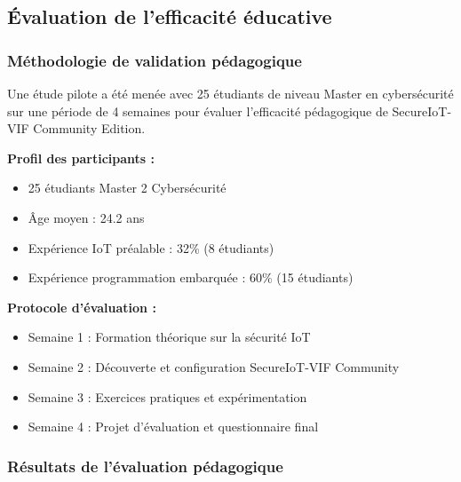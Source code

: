 \subsection{Évaluation de l'efficacité éducative}

\subsubsection{Méthodologie de validation pédagogique}

Une étude pilote a été menée avec 25 étudiants de niveau Master en cybersécurité sur une période de 4 semaines pour évaluer l'efficacité pédagogique de SecureIoT-VIF Community Edition.

\textbf{Profil des participants :}
\begin{itemize}
    \item 25 étudiants Master 2 Cybersécurité
    \item Âge moyen : 24.2 ans
    \item Expérience IoT préalable : 32\% (8 étudiants)
    \item Expérience programmation embarquée : 60\% (15 étudiants)
\end{itemize}

\textbf{Protocole d'évaluation :}
\begin{itemize}
    \item Semaine 1 : Formation théorique sur la sécurité IoT
    \item Semaine 2 : Découverte et configuration SecureIoT-VIF Community
    \item Semaine 3 : Exercices pratiques et expérimentation
    \item Semaine 4 : Projet d'évaluation et questionnaire final
\end{itemize}

\subsubsection{Résultats de l'évaluation pédagogique}

